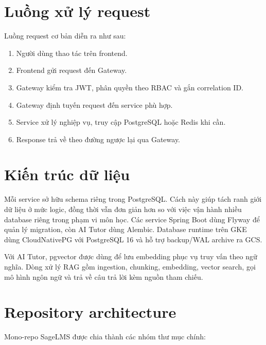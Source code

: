 \section{Luồng xử lý request}

Luồng request cơ bản diễn ra như sau:

\begin{enumerate}
  \item Người dùng thao tác trên frontend.
  \item Frontend gửi request đến Gateway.
  \item Gateway kiểm tra JWT, phân quyền theo RBAC và gắn correlation ID.
  \item Gateway định tuyến request đến service phù hợp.
  \item Service xử lý nghiệp vụ, truy cập PostgreSQL hoặc Redis khi cần.
  \item Response trả về theo đường ngược lại qua Gateway.
\end{enumerate}

\label{fig:request-flow}

\section{Kiến trúc dữ liệu}

Mỗi service sở hữu schema riêng trong PostgreSQL. Cách này giúp tách ranh giới dữ liệu ở mức logic, đồng thời vẫn đơn giản hơn so với việc vận hành nhiều database riêng trong phạm vi môn học. Các service Spring Boot dùng Flyway để quản lý migration, còn AI Tutor dùng Alembic. Database runtime trên GKE dùng CloudNativePG với PostgreSQL 16 và hỗ trợ backup/WAL archive ra GCS.

Với AI Tutor, pgvector được dùng để lưu embedding phục vụ truy vấn theo ngữ nghĩa. Dòng xử lý RAG gồm ingestion, chunking, embedding, vector search, gọi mô hình ngôn ngữ và trả về câu trả lời kèm nguồn tham chiếu.

\section{Repository architecture}

Mono-repo SageLMS được chia thành các nhóm thư mục chính:

